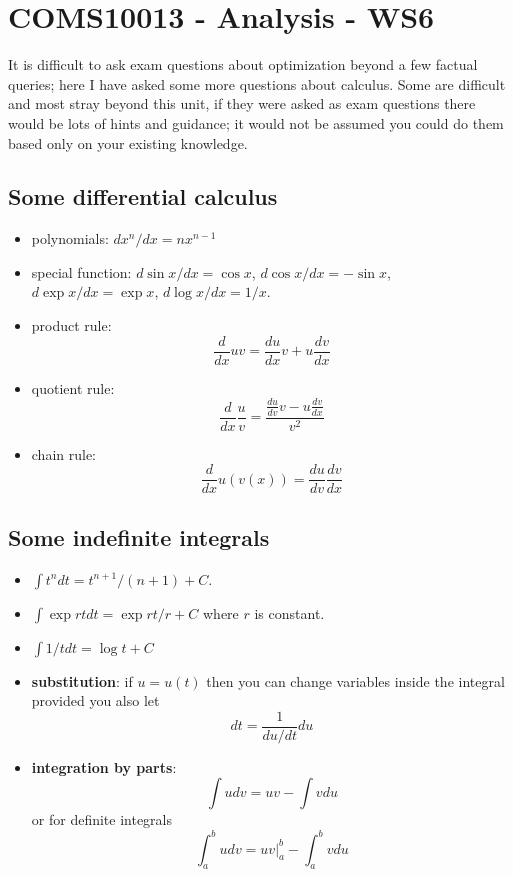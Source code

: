 \documentclass[11pt,a4paper]{scrartcl}
\begin{document}
\section*{COMS10013 - Analysis - WS6}

It is difficult to ask exam questions about optimization beyond a few
factual queries; here I have asked some more questions about
calculus. Some are difficult and most stray beyond this unit, if they
were asked as exam questions there would be lots of hints and
guidance; it would not be assumed you could do them based only on your
existing knowledge.

\subsection*{Some differential calculus}
\begin{itemize}
\item polynomials: $dx^n/dx=nx^{n-1}$
\item special function: $d\sin{x}/dx=\cos{x}$, $d\cos{x}/dx=-\sin{x}$, $d\exp{x}/dx=\exp{x}$, $d\log{x}/dx=1/x$.
\item product rule:
$$\frac{d}{dx}uv = \frac{du}{dx}v+u\frac{dv}{dx}$$
\item quotient rule:
$$\frac{d}{dx}\frac{u}{v}=\frac{\frac{du}{dv}v-u\frac{dv}{dx}}{v^2}$$
\item chain rule:
$$\frac{d}{dx}u(v(x))=\frac{du}{dv}\frac{dv}{dx}$$
\end{itemize}
  
\subsection*{Some indefinite integrals}
\begin{itemize}
\item $\int t^ndt =t^{n+1}/(n+1)+C$.
\item $\int \exp{rt}dt = \exp{rt}/r +C$ where $r$ is constant.
\item $\int 1/t{} dt = \log{t}+C$
\item \textbf{substitution}: if $u=u(t)$ then you can change variables inside the integral provided you also let
  \begin{equation}
    dt=\frac{1}{du/dt}du
  \end{equation}
\item \textbf{integration by parts}:
  \begin{equation}
    \int udv =uv-\int vdu
  \end{equation}
  or for definite integrals
  \begin{equation}
    \int_a^b udv =\left.uv\right|_a^b-\int_a^b vdu
  \end{equation}
  
\end{itemize}
\end{document}
